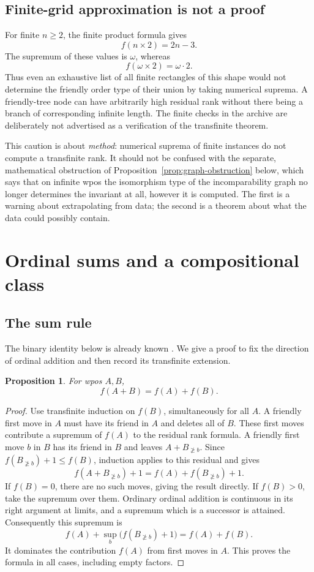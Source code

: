 \documentclass[11pt,letterpaper]{article}
\newtheorem{proposition}[theorem]{Proposition}
\theoremstyle{definition}
\theoremstyle{remark}
\newcommand{\res}[2]{#1_{\not\ge #2}}
\begin{document}
\subsection{Finite-grid approximation is not a proof}
For finite $n\ge2$, the finite product formula gives
\[
 f(n\times2)=2n-3.
\]
The supremum of these values is $\omega$, whereas
\[
 f(\omega\times2)=\omega\cdot2.
\]
Thus even an exhaustive list of all finite rectangles of this shape would
not determine the friendly order type of their union by taking numerical
suprema. A friendly-tree node can have arbitrarily high residual rank
without there being a branch of corresponding infinite length. The
finite checks in the archive are deliberately not advertised as a
verification of the transfinite theorem.

This caution is about \emph{method}: numerical suprema of finite instances
do not compute a transfinite rank. It should not be confused with the
separate, mathematical obstruction of
Proposition~\ref{prop:graph-obstruction} below, which says that on infinite
wpos the isomorphism type of the incomparability graph no longer determines
the invariant at all, however it is computed. The first is a warning about
extrapolating from data; the second is a theorem about what the data could
possibly contain.

\section{Ordinal sums and a compositional class}\label{sec:sums}

\subsection{The sum rule}
The binary identity below is already known
\cite[Theorem~5.4.8(1)]{VialardThesis}. We give a proof to fix the direction
of ordinal addition and then record its transfinite extension.

\begin{proposition}\label{prop:binary-sum}
For wpos $A,B$,
\[
 f(A+B)=f(A)+f(B).
\]
\end{proposition}
\begin{proof}
Use transfinite induction on $f(B)$, simultaneously for all $A$. A
friendly first move in $A$ must have its friend in $A$ and deletes all of
$B$. These first moves contribute a supremum of $f(A)$ to the residual
rank formula. A friendly first move $b$ in $B$ has its friend in $B$ and
leaves $A+\res B b$. Since
$f(\res B b)+1\le f(B)$, induction applies to this residual and gives
\[
 f(A+\res B b)+1
   =f(A)+f(\res B b)+1.
\]
If $f(B)=0$, there are no such moves, giving the result directly. If
$f(B)>0$, take the supremum over them. Ordinary ordinal addition is
continuous in its right argument at limits, and a supremum which is a
successor is attained. Consequently this supremum is
\[
 f(A)+\sup_b\bigl(f(\res B b)+1\bigr)=f(A)+f(B).
\]
It dominates the contribution $f(A)$ from first moves in $A$. This proves
the formula in all cases, including empty factors.
\end{proof}
\end{document}

